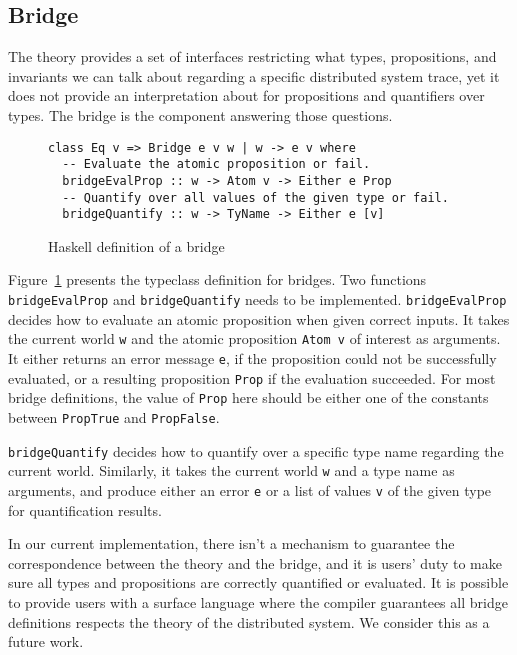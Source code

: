 \documentclass[format=acmsmall, nonacm=true, review=true]{acmart}
\newcommand{\mycaption}[1]{\Description{#1}\caption{#1}}
\begin{document}
\subsection{Bridge}

The theory provides a set of interfaces restricting what types, propositions, and invariants we can talk about regarding a specific distributed system trace, yet it does not provide an interpretation about for propositions and quantifiers over types.
The bridge is the component answering those questions.

\begin{figure}[h]
  {
    \fontsize{10}{12}\selectfont
    \begin{verbatim}
class Eq v => Bridge e v w | w -> e v where
  -- Evaluate the atomic proposition or fail.
  bridgeEvalProp :: w -> Atom v -> Either e Prop
  -- Quantify over all values of the given type or fail.
  bridgeQuantify :: w -> TyName -> Either e [v]
\end{verbatim}
  }
  \mycaption{Haskell definition of a bridge}
  \label{fig:bridge-sig}
\end{figure}

Figure~\ref{fig:bridge-sig} presents the typeclass definition for bridges.
Two functions \texttt{bridgeEvalProp} and \texttt{bridgeQuantify} needs to be implemented.
\texttt{bridgeEvalProp} decides how to evaluate an atomic proposition when given correct inputs. It takes the current world \texttt{w} and the atomic proposition \texttt{Atom v} of interest as arguments.
It either returns an error message \texttt{e}, if the proposition could not be successfully evaluated, or a resulting proposition \texttt{Prop} if the evaluation succeeded.
For most bridge definitions, the value of \texttt{Prop} here should be either one of the constants between \texttt{PropTrue} and \texttt{PropFalse}.

\texttt{bridgeQuantify} decides how to quantify over a specific type name regarding the current world.
Similarly, it takes the current world \texttt{w} and a type name as arguments, and produce either an error \texttt{e} or a list of values \texttt{v} of the given type for quantification results.

In our current implementation, there isn't a mechanism to guarantee the correspondence between the theory and the bridge, and it is users' duty to make sure all types and propositions are correctly quantified or evaluated.
It is possible to provide users with a surface language where the compiler guarantees all bridge definitions respects the theory of the distributed system. We consider this as a future work.
\end{document}

